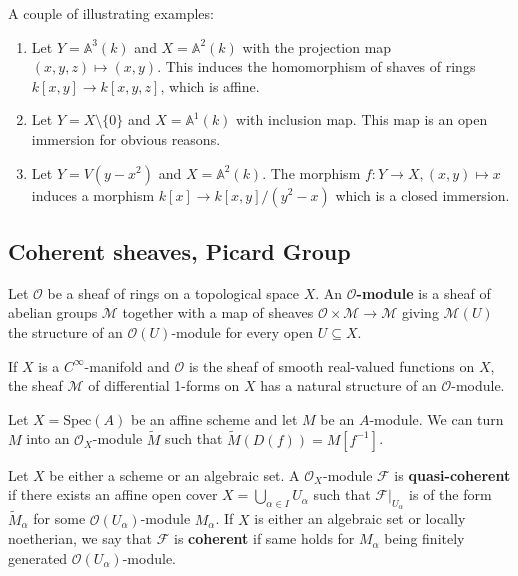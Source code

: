 \documentclass{template}
\begin{document}
\begin{example}
    A couple of illustrating examples:
    \begin{enumerate}
        \item[(a)] Let $Y=\mathbb{A}^3(k)$ and $X=\mathbb{A}^2(k)$ with the projection map $(x,y,z) \mapsto (x,y)$.
        This induces the homomorphism of shaves of rings $k[x,y] \to k[x,y,z]$, which is affine.
        \item[(b)] Let $Y = X \setminus \{0\}$ and $X=\mathbb{A}^1(k)$ with inclusion map. This map is an open immersion for obvious reasons.
        \item[(c)] Let $Y = V(y-x^2)$ and $X=\mathbb{A}^2(k)$. The morphism $f: Y \to X, (x,y) \mapsto x$ induces a morphism 
        $k[x] \to k[x,y]/(y^2-x)$ which is a closed immersion.
    \end{enumerate}
\end{example}

\subsection{Coherent sheaves, Picard Group}

\begin{definition}
    Let $\mathcal{O}$ be a sheaf of rings on a topological space $X$. 
    An \textbf{$\mathcal{O}$-module} is a sheaf of abelian groups $\mathcal{M}$
    together with a map of sheaves $\mathcal{O} \times \mathcal{M} \to \mathcal{M}$
    giving $\mathcal{M}(U)$ the structure of an $\mathcal{O}(U)$-module for every 
    open $U \subseteq X$. 
\end{definition}

\begin{example}
    If $X$ is a $C^{\infty}$-manifold and $\mathcal{O}$ is the sheaf of smooth 
    real-valued functions on $X$, the sheaf $\mathcal{M}$ of differential 1-forms
    on $X$ has a natural structure of an $\mathcal{O}$-module.
\end{example}

\begin{example}
    Let $X = \text{Spec}(A)$ be an affine scheme and let $M$ be an $A$-module.
    We can turn $M$ into an $\mathcal{O}_X$-module $\widetilde{M}$ such that 
    $\widetilde{M}(D(f)) = M[f^{-1}]$.
\end{example}

\begin{definition}
    Let $X$ be either a scheme or an algebraic set. A $\mathcal{O}_X$-module 
    $\mathcal{F}$ is \textbf{quasi-coherent} if there exists an affine open cover 
    $X=\bigcup_{\alpha \in I}U_{\alpha}$ such that $\mathcal{F}|_{U_{\alpha}}$ is of 
    the form $\widetilde{M}_{\alpha}$ for some $\mathcal{O}(U_{\alpha})$-module 
    $M_{\alpha}$. If $X$ is either an algebraic set or locally noetherian, we say 
    that $\mathcal{F}$ is \textbf{coherent} if same holds for $M_{\alpha}$ being 
    finitely generated $\mathcal{O}(U_{\alpha})$-module.
\end{definition}

\begin{example}
    
\end{example}

\nocite{*}
\renewcommand{\refname}{}


\end{document}
